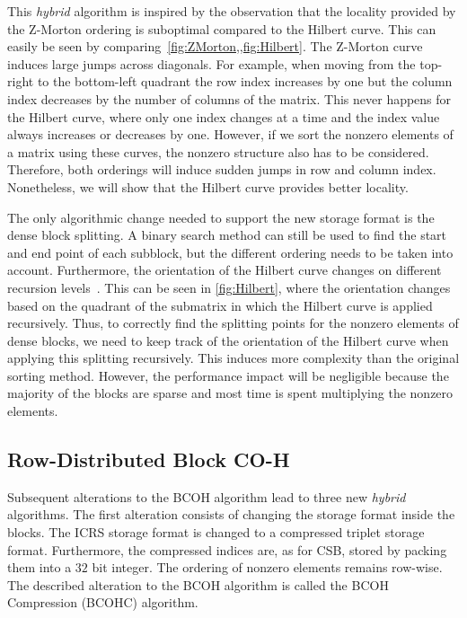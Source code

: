\documentclass{siamart220329}
\begin{document}
This \textit{hybrid} algorithm is inspired by the observation that the locality provided by the Z-Morton ordering is suboptimal compared to the Hilbert curve. This can easily be seen by comparing~\cref{fig:ZMorton,,fig:Hilbert}. The Z-Morton curve induces large jumps across diagonals. For example, when moving from the top-right to the bottom-left quadrant the row index increases by one but the column index decreases by the number of columns of the matrix. This never happens for the Hilbert curve, where only one index changes at a time and the index value always increases or decreases by one. However, if we sort the nonzero elements of a matrix using these curves, the nonzero structure also has to be considered. Therefore, both orderings will induce sudden jumps in row and column index. Nonetheless, we will show that the Hilbert curve provides better locality.

The only algorithmic change needed to support the new storage format is the dense block splitting. A binary search method can still be used to find the start and end point of each subblock, but the different ordering needs to be taken into account. Furthermore, the orientation of the Hilbert curve changes on different recursion levels~\cite{Hilbert-Curve}. This can be seen in \cref{fig:Hilbert}, where the orientation changes based on the quadrant of the submatrix in which the Hilbert curve is applied recursively. Thus, to correctly find the splitting points for the nonzero elements of dense blocks, we need to keep track of the orientation of the Hilbert curve when applying this splitting recursively. This induces more complexity than the original sorting method. However, the performance impact will be negligible because the majority of the blocks are sparse and most time is spent multiplying the nonzero elements.

\subsection{Row-Distributed Block CO-H}\label{sec:Hybrid-BCOH}
Subsequent alterations to the BCOH algorithm lead to three new \textit{hybrid} algorithms. The first alteration consists of changing the storage format inside the blocks. The ICRS storage format is changed to a compressed triplet storage format. Furthermore, the compressed indices are, as for CSB, stored by packing them into a $32$ bit integer. The ordering of nonzero elements remains row-wise. The described alteration to the BCOH algorithm is called the BCOH Compression (BCOHC) algorithm.
\end{document}
